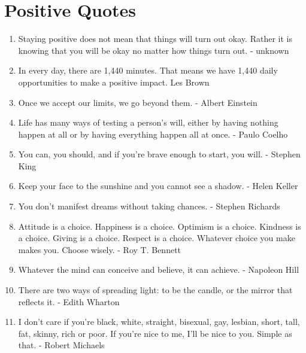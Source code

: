 
\chapter{Positive Quotes}


    \begin{enumerate}
        \item Staying positive does not mean that things will turn out okay. Rather it is knowing that you will be okay no matter how things turn out. - unknown

        \item In every day, there are 1,440 minutes. That means we have 1,440 daily opportunities to make a positive impact. Les Brown

        \item Once we accept our limits, we go beyond them. - Albert Einstein

        \item Life has many ways of testing a person’s will, either by having nothing happen at all or by having everything happen all at once. - Paulo Coelho

        \item You can, you should, and if you’re brave enough to start, you will.
        - Stephen King

        \item Keep your face to the sunshine and you cannot see a shadow. - Helen Keller

        \item You don’t manifest dreams without taking chances. - Stephen Richards

        \item Attitude is a choice. Happiness is a choice. Optimism is a choice. Kindness is a choice. Giving is a choice. Respect is a choice. Whatever choice you make makes you. Choose wisely. - Roy T. Bennett

        \item Whatever the mind can conceive and believe, it can achieve. - Napoleon Hill

        \item There are two ways of spreading light: to be the candle, or the mirror that reflects it. - Edith Wharton

        \item I don’t care if you’re black, white, straight, bisexual, gay, lesbian, short, tall, fat, skinny, rich or poor. If you’re nice to me, I’ll be nice to you. Simple as that. - Robert Michaels


\end{enumerate}
